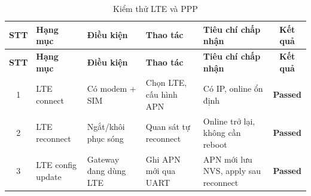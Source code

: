         \begin{longtable}{|c|p{2cm}|p{3.5cm}|p{2.5cm}|p{4cm}|c|}
            \caption{Kiểm thử LTE và PPP}
            \label{tab:test_lte_ppp} \\
            \hline
            \textbf{STT} & \textbf{Hạng mục} & \textbf{Điều kiện} & \textbf{Thao tác} & \textbf{Tiêu chí chấp nhận} & \textbf{Kết quả} \\ \hline
            \endfirsthead
        
            \hline
            \textbf{STT} & \textbf{Hạng mục} & \textbf{Điều kiện} & \textbf{Thao tác} & \textbf{Tiêu chí chấp nhận} & \textbf{Kết quả} \\ \hline
            \endhead
        
            \hline
            \endfoot
            \endlastfoot
        
            1 & LTE connect & Có modem + SIM & Chọn LTE, cấu hình APN & Có IP, online ổn định & \textcolor{modern_blue}{\textbf{Passed}} \\ \hline
            2 & LTE reconnect & Ngắt/khôi phục sóng & Quan sát tự reconnect & Online trở lại, không cần reboot & \textcolor{modern_blue}{\textbf{Passed}} \\ \hline
            3 & LTE config update & Gateway đang dùng LTE & Ghi APN mới qua UART & APN mới lưu NVS, apply sau reconnect & \textcolor{modern_blue}{\textbf{Passed}} \\ \hline
        \end{longtable}
        
